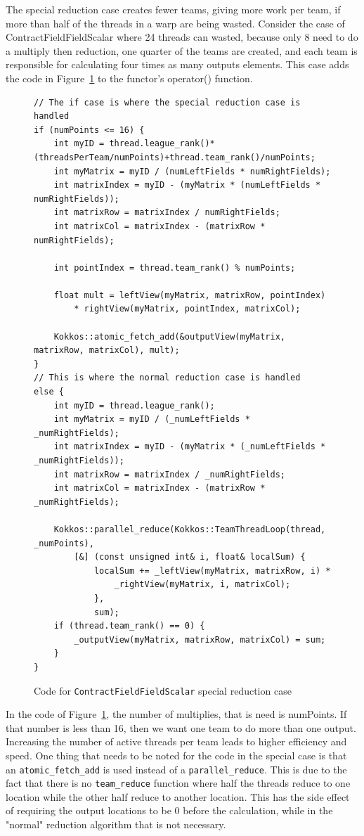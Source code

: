 The special reduction case creates fewer teams, giving more work per team, if
more than half of the threads in a warp are being wasted. Consider the
case of ContractFieldFieldScalar where 24 threads can wasted, because only 8
need to do a multiply then reduction, one quarter of the teams are created, and
each team is responsible for calculating four times as many outputs elements.
This case adds the code in
Figure~\ref{lst:ContractFieldFieldScalarReductionSpecialCase} to the functor's
operator() function. \\
\begin{figure}[!ht]
    \begin{lstlisting}
// The if case is where the special reduction case is handled
if (numPoints <= 16) {	
	int myID = thread.league_rank()*(threadsPerTeam/numPoints)+thread.team_rank()/numPoints;
	int myMatrix = myID / (numLeftFields * numRightFields);
	int matrixIndex = myID - (myMatrix * (numLeftFields * numRightFields));
	int matrixRow = matrixIndex / numRightFields;
	int matrixCol = matrixIndex - (matrixRow * numRightFields);

	int pointIndex = thread.team_rank() % numPoints;

	float mult = leftView(myMatrix, matrixRow, pointIndex) 
		* rightView(myMatrix, pointIndex, matrixCol);

	Kokkos::atomic_fetch_add(&outputView(myMatrix, matrixRow, matrixCol), mult);
}
// This is where the normal reduction case is handled
else {
	int myID = thread.league_rank();
	int myMatrix = myID / (_numLeftFields * _numRightFields);
	int matrixIndex = myID - (myMatrix * (_numLeftFields * _numRightFields));
	int matrixRow = matrixIndex / _numRightFields;
	int matrixCol = matrixIndex - (matrixRow * _numRightFields);

	Kokkos::parallel_reduce(Kokkos::TeamThreadLoop(thread, _numPoints),
		[&] (const unsigned int& i, float& localSum) {
			localSum += _leftView(myMatrix, matrixRow, i) *
				_rightView(myMatrix, i, matrixCol);
			},
			sum);
	if (thread.team_rank() == 0) {
		_outputView(myMatrix, matrixRow, matrixCol) = sum;
	}
}
    \end{lstlisting}
\caption{Code for \texttt{ContractFieldFieldScalar} special reduction case
\label{lst:ContractFieldFieldScalarReductionSpecialCase}} 
\end{figure}

In the code of Figure~\ref{lst:ContractFieldFieldScalarReductionSpecialCase}, the number of multiplies, that is need is numPoints. If that number is less than 16, then we want one team to do more than one output. Increasing the number of active threads per team leads to higher efficiency and speed.
One thing that needs to be noted for the code in the special case is that an
\texttt{atomic\_fetch\_add} is used instead of a \texttt{parallel\_reduce}. This is due to the fact
that there is no \texttt{team\_reduce} function where half the threads reduce to one
location while the other half reduce to another location. This has the side
effect of requiring the output locations to be 0 before the calculation, while
in the "normal" reduction algorithm that is not necessary. 

